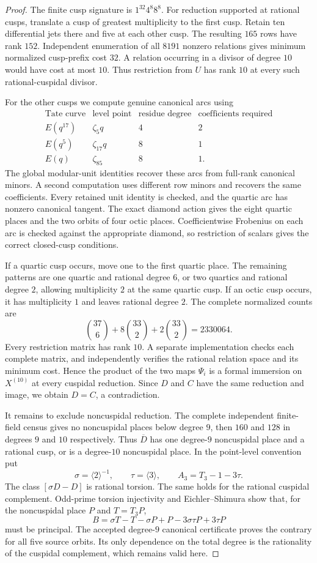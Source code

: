 \begin{proof}
The finite cusp signature is $1^{32}4^8 8^8$.
For reduction supported at rational cusps, translate a cusp of greatest
multiplicity to the first cusp. Retain ten differential jets there
and five at each other cusp. The resulting $165$ rows have rank
$152$. Independent enumeration of all $8191$ nonzero relations gives
minimum normalized cusp-prefix cost $32$. A relation occurring in a
divisor of degree $10$ would have cost at most $10$. Thus restriction
from $U$ has rank $10$ at every such rational-cuspidal divisor.

For the other cusps we compute genuine canonical arcs using
\[
 \begin{array}{c|c|c|c}
 \text{Tate curve}&\text{level point}&\text{residue degree}
       &\text{coefficients required}\\ \hline
 E(q^{17})&\zeta_5q&4&2\\
 E(q^5)&\zeta_{17}q&8&1\\
 E(q)&\zeta_{85}&8&1.
 \end{array}
\]
The global modular-unit identities recover these arcs from full-rank
canonical minors. A second computation uses different row minors and
recovers the same coefficients. Every retained unit identity is
checked, and the quartic arc has nonzero canonical tangent.
The exact diamond action gives the eight quartic places and the two
orbits of four octic places. Coefficientwise Frobenius on each arc
is checked against the appropriate diamond, so restriction of scalars
gives the correct closed-cusp conditions.

If a quartic cusp occurs, move one to the first quartic place.
The remaining patterns are one quartic and rational degree $6$, or
two quartics and rational degree $2$, allowing multiplicity $2$ at
the same quartic cusp. If an octic cusp occurs, it has multiplicity
$1$ and leaves rational degree $2$. The complete normalized counts are
\[
 \binom{37}{6}+8\binom{33}{2}+2\binom{33}{2}=2330064.
\]
Every restriction matrix has rank $10$. A separate implementation
checks each complete matrix, and independently verifies the rational
relation space and its minimum cost. Hence the product of the two
maps $\Psi_i$ is a formal immersion on $X^{(10)}$ at every cuspidal
reduction. Since $D$ and $C$ have the same reduction and image, we
obtain $D=C$, a contradiction.

It remains to exclude noncuspidal reduction. The complete independent
finite-field census gives no noncuspidal places below degree $9$,
then $160$ and $128$ in degrees $9$ and $10$ respectively.
Thus $\overline D$ has one degree-$9$ noncuspidal place and a rational
cusp, or is a degree-$10$ noncuspidal place.
In the point-level convention put
\[
 \sigma=\langle2\rangle^{-1},\qquad \tau=\langle3\rangle,
 \qquad A_3=T_3-1-3\tau.
\]
The class $[\sigma D-D]$ is rational torsion. The same holds for
the rational cuspidal complement. Odd-prime torsion injectivity and
Eichler--Shimura show that, for the noncuspidal place $P$ and $T=T_3P$,
\[
 B=\sigma T-T-\sigma P+P-3\sigma\tau P+3\tau P
\]
must be principal. The accepted degree-$9$ canonical certificate
proves the contrary for all five source orbits. Its only dependence
on the total degree is the rationality of the cuspidal complement,
which remains valid here.


\end{proof}
